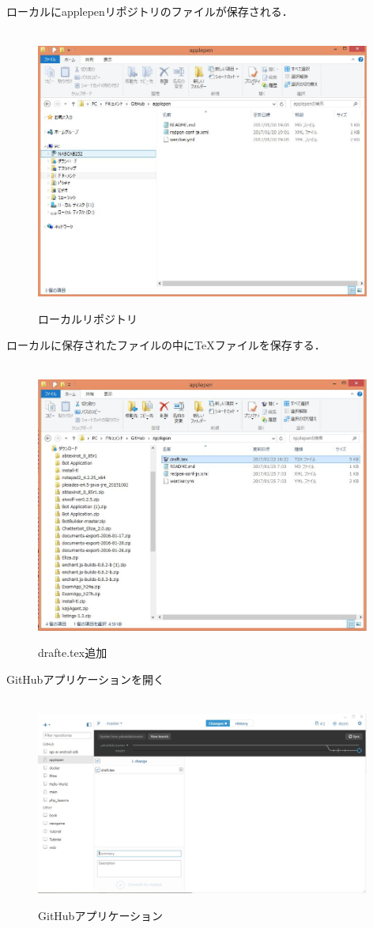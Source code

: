 \newpage
ローカルにapplepenリポジトリのファイルが保存される．
\begin{figure}
\centering　
\includegraphics[width=11cm]{18.JPG}
\caption{ローカルリポジトリ}\label{tab:uac}
\end{figure}
\newpage

ローカルに保存されたファイルの中にTeXファイルを保存する．

\begin{figure}
\centering　
\includegraphics[width=11cm]{21.JPG}
\caption{drafte.tex追加}\label{tab:uac}
\end{figure}
\newpage

GitHubアプリケーションを開く
\begin{figure}
\centering　
\includegraphics[width=11cm]{20.JPG}
\caption{GitHubアプリケーション}\label{tab:uac}
\end{figure}

